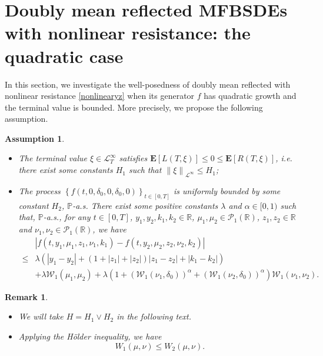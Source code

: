 \documentclass[10pt]{article}%
\numberwithin{equation}{section}
\newtheorem{remark}[theorem]{Remark}
\newtheorem{assumption}[theorem]{Assumption}
\def \E{\mathbf{E}}
\begin{document}
\section{Doubly mean reflected MFBSDEs with nonlinear resistance: the quadratic case}	
In this section, we investigate the well-posedness of doubly mean reflected  with nonlinear resistance \eqref{nonlinearyz} when its generator $f$ has quadratic growth  and the terminal value is bounded. More precisely, we propose the  following assumption.
\begin{assumption}\label{assqua}
\begin{itemize}
      \item[(i)]  The terminal value $\xi \in \mathcal{L}^{\infty}_T $ satisfies $\mathbf{E}[L(T,\xi)]\leq 0 \leq \mathbf{E}[R(T,\xi)]$, i.e. there exist some constants $H_1$ such that $\left \| \xi  \right \|_{\mathcal{L}^\infty}\leq H_1$; 
      \item[(ii)] The process $\left\{f\left(t, 0, \delta_0, 0,\delta_0,0 \right)\right\}_{t\in[0,T]}$ is uniformly bounded by some constant $H_2$, $\mathbb{P}$-a.s. There exist some positive constants $\lambda$ and $\alpha\in[0,1)$ such that, $\mathbb{P}$-a.s., for any $t \in[0, T]$, $ y_1, y_2 , k_1, k_2\in \mathbb{R}$, $\mu_1, \mu_2 \in \mathcal{P}_1(\mathbb{R})$, $z_1, z_2 \in \mathbb{R}$ and $\nu_1, \nu_2 \in \mathcal{P}_1(\mathbb{R})$, we have
	$$
    \begin{aligned}
		& \left|f\left(t, y_1, \mu_1, z_1,\nu_1, k_1\right)-f\left(t, y_2, \mu_2, z_2, \nu_2, k_2\right)\right| \\
		\leq &\lambda\left(\left|y_1-y_2\right|+\left(1+\left|z_1\right|+\left|z_2\right|\right)\left|z_1-z_2\right|+\left|k_1-k_2\right|\right)\\
        & +\lambda \mathcal{W}_1\left(\mu_1,\mu_2\right)+\lambda \left(1+\left(\mathcal{W}_1\left(\nu_1,\delta_0\right)\right)^{\alpha}+\left(\mathcal{W}_1\left(\nu_2,\delta_0\right)\right)^{\alpha}\right)\mathcal{W}_1\left(\nu_1,\nu_2\right).
	\end{aligned}
	$$ 
   \end{itemize}
 \end{assumption}
 
\begin{remark}
\begin{itemize}
    \item[(i)] We will take $H=H_1 \vee H_2$ in the following text.
    \item[(ii)]%
 Applying the H\"{o}lder inequality, we have $$W_1(\mu,\nu)\leq W_2(\mu,\nu).$$
\end{itemize}
\end{remark}
\end{document}
